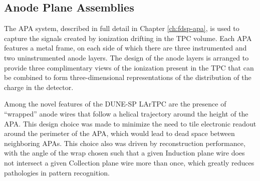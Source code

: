 

\subsection{Anode Plane Assemblies}
\label{sec:fdsp-ov-apa}

The APA system, described in full detail in Chapter \ref{ch:fdsp-apa}, is used to capture the signals created by ionization drifting in the TPC volume.  Each APA features a metal frame, on each side of which there are three instrumented and two uninstrumented anode layers.  The design of the anode layers is arranged to provide three complimentary views of the ionization present in the TPC that can be combined to form three-dimensional representations of the distribution of the charge in the detector.  

Among the novel features of the DUNE-SP LArTPC are the presence of ``wrapped'' anode wires that follow a helical trajectory around the height of the APA.  This design choice was made to minimize the need to tile electronic readout around the perimeter of the APA, which would lead to dead space between neighboring APAs.  This choice also was driven by reconstruction performance, with the angle of the wrap chosen such that a given Induction plane wire does not intersect a given Collection plane wire more than once, which greatly reduces pathologies in pattern recognition. 


